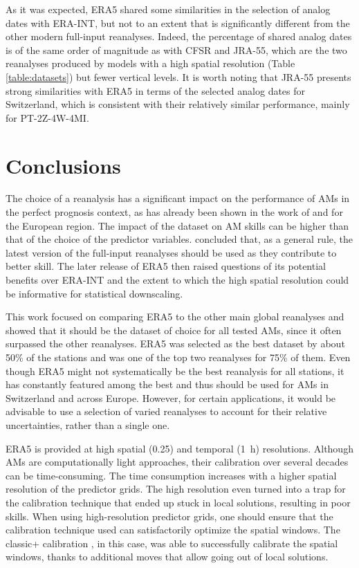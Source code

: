 \documentclass[alpha-refs]{wiley-article}
\begin{document}
As it was expected, ERA5 shared some similarities in the selection of analog dates with ERA-INT, but not to an extent that is significantly different from the other modern full-input reanalyses. Indeed, the percentage of shared analog dates is of the same order of magnitude as with CFSR and JRA-55, which are the two reanalyses produced by models with a high spatial resolution (Table \ref{table:datasets}) but fewer vertical levels. It is worth noting that JRA-55 presents strong similarities with ERA5 in terms of the selected analog dates for Switzerland, which is consistent with their relatively similar performance, mainly for PT-2Z-4W-4MI.


\section{Conclusions}
\label{sec:conclusion}

The choice of a reanalysis has a significant impact on the performance of AMs in the perfect prognosis context, as has already been shown in the work of \citet{Dayon2015} and \citet{Horton2018b} for the European region. The impact of the dataset on AM skills can be higher than that of the choice of the predictor variables. \citet{Horton2018b} concluded that, as a general rule, the latest version of the full-input reanalyses should be used as they contribute to better skill. The later release of ERA5 then raised questions of its potential benefits over ERA-INT and the extent to which the high spatial resolution could be informative for statistical downscaling.

This work focused on comparing ERA5 to the other main global reanalyses and showed that it should be the dataset of choice for all tested AMs, since it often surpassed the other reanalyses. ERA5 was selected as the best dataset by about 50\% of the stations and was one of the top two reanalyses for 75\% of them. Even though ERA5 might not systematically be the best reanalysis for all stations, it has constantly featured among the best and thus should be used for AMs in Switzerland and across Europe. However, for certain applications, it would be advisable to use a selection of varied reanalyses to account for their relative uncertainties, rather than a single one.

ERA5 is provided at high spatial (0.25\degree) and temporal (1~h) resolutions. Although AMs are computationally light approaches, their calibration over several decades can be time-consuming. The time consumption increases with a higher spatial resolution of the predictor grids. The high resolution even turned into a trap for the calibration technique that ended up stuck in local solutions, resulting in poor skills. When using high-resolution predictor grids, one should ensure that the calibration technique used can satisfactorily optimize the spatial windows. The classic+ calibration \citep{Horton2019}, in this case, was able to successfully calibrate the spatial windows, thanks to additional moves that allow going out of local solutions.
\end{document}
